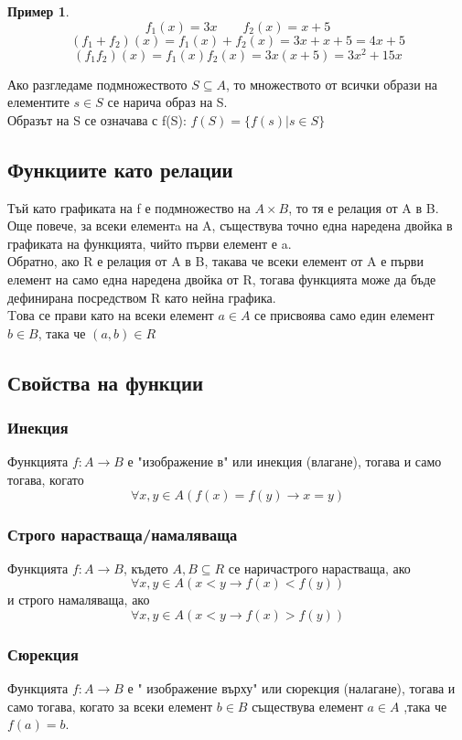 \documentclass[fleqn, 12pt]{article}
\theoremstyle{definition}
\newtheorem{example}{Пример}[subsection]
\begin{document}
\begin{example}
$$f_1(x) = 3x \qquad f_2(x) = x+5 $$
$$(f_1+ f_2)(x) =  f_1(x) + f_2(x) = 3x + x + 5 = 4x + 5$$
$$(f_1f_2)(x) =  f_1(x) f_2(x) = 3x(x + 5) = 3x^2 + 15x$$
\end{example}
Ако разгледаме подмножеството $S \subseteq A$, то множеството от всички образи на елементите $s \in S$ се нарича образ на S.\\  
Образът на S се означава с f(S): $f(S) = \{f(s) | s \in S\}$

\subsection{Функциите като релации}
Тъй като графиката на f е подмножество на $A \times B$, то тя е релация от A в B.\\
Още повече, за всеки елементa на A, съществува точно една наредена двойка в графиката на функцията, чийто първи елемент е a.\\
Обратно, ако R е релация от A в B, такава че всеки елемент от A е първи елемент на само една наредена двойка от R, тогава функцията може да бъде дефинирана посредством R като нейна графика.\\
Tова се прави като на всеки елемент $a \in A$ се присвоява само един елемент $b \in B$, така че $(a, b) \in R$

\subsection{Свойства на функции}

\subsubsection{Инекция}
Функцията $f: A \rightarrow B$ е "изображение в" или инекция (влагане), тогава и само тогава, когато
$$\forall x, y \in A (f(x) = f(y) \rightarrow x = y)$$

\subsubsection{Строго нарастваща/намаляваща}
Функцията $f: A \rightarrow B$, където $A,B \subseteq R$ се наричастрого нарастваща, ако
$$\forall x,y\in A (x < y \rightarrow f(x) < f(y))$$ 
и строго намаляваща, ако
$$\forall x,y\in A (x < y \rightarrow f(x) > f(y))$$ 

\subsubsection{Сюрекция}
Функцията $f: A \rightarrow B$ е " изображение върху" или сюрекция (налагане), тогава и само тогава, когато за всеки елемент $b \in B$ съществува елемент $a \in A$ ,така че $f(a) = b$.
\end{document}
